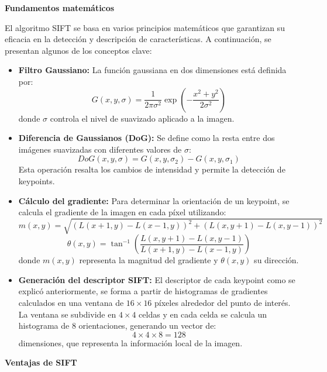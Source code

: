 \documentclass[a4paper]{article}
\begin{document}
  \par\vspace{0.5cm}
  \textbf{Fundamentos matemáticos}
  \par\vspace{0.5cm}
  
  El algoritmo SIFT se basa en varios principios matemáticos que garantizan su eficacia en la detección y descripción de características. A continuación, se presentan algunos de los conceptos clave:
  
  \begin{itemize}
      \item \textbf{Filtro Gaussiano:}  
      La función gaussiana en dos dimensiones está definida por:
      \[
      G(x, y, \sigma) = \frac{1}{2\pi\sigma^2} \exp\left(-\frac{x^2 + y^2}{2\sigma^2}\right)
      \]
      donde \(\sigma\) controla el nivel de suavizado aplicado a la imagen.
      
      \item \textbf{Diferencia de Gaussianos (DoG):}  
      Se define como la resta entre dos imágenes suavizadas con diferentes valores de \(\sigma\):
      \[
      DoG(x, y, \sigma) = G(x, y, \sigma_2) - G(x, y, \sigma_1)
      \]
      Esta operación resalta los cambios de intensidad y permite la detección de keypoints.
      
      \item \textbf{Cálculo del gradiente:}  
      Para determinar la orientación de un keypoint, se calcula el gradiente de la imagen en cada píxel utilizando:
      \[
      m(x, y) = \sqrt{(L(x+1, y) - L(x-1, y))^2 + (L(x, y+1) - L(x, y-1))^2}
      \]
      \[
      \theta(x, y) = \tan^{-1} \left(\frac{L(x, y+1) - L(x, y-1)}{L(x+1, y) - L(x-1, y)}\right)
      \]
      donde \(m(x, y)\) representa la magnitud del gradiente y \(\theta(x, y)\) su dirección.
      
      \item \textbf{Generación del descriptor SIFT:}  
      El descriptor de cada keypoint como se explicó anteriormente, se forma a partir de histogramas de gradientes calculados en una ventana de \(16\times16\) píxeles alrededor del punto de interés. La ventana se subdivide en \(4\times4\) celdas y en cada celda se calcula un histograma de 8 orientaciones, generando un vector de:
      \[
      4 \times 4 \times 8 = 128
      \]
      dimensiones, que representa la información local de la imagen.
  \end{itemize}
  
  \par\vspace{0.5cm}
  \textbf{Ventajas de SIFT}
  \par\vspace{0.5cm}
  
\end{document}
